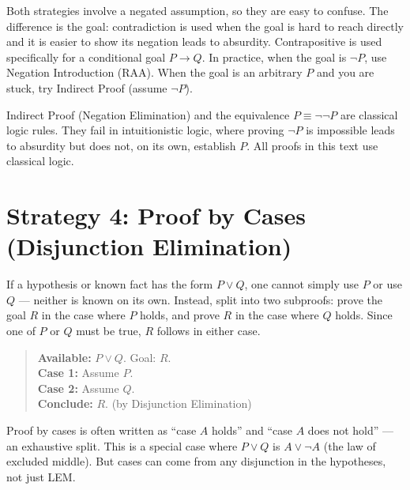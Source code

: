 \begin{remark}
Both strategies involve a negated assumption, so they are easy to confuse.
The difference is the goal: contradiction is used when the goal is hard to
reach directly and it is easier to show its negation leads to absurdity.
Contrapositive is used specifically for a conditional goal $P \to Q$.
In practice, when the goal is $\neg P$, use Negation Introduction (RAA). When
the goal is an arbitrary $P$ and you are stuck, try Indirect Proof (assume
$\neg P$).
\end{remark}

\begin{remark}
Indirect Proof (Negation Elimination) and the equivalence $P \equiv \neg\neg P$
are classical logic rules. They fail in intuitionistic logic, where proving $\neg P$
is impossible leads to absurdity but does not, on its own, establish $P$.
All proofs in this text use classical logic.
\end{remark}


\section*{Strategy 4: Proof by Cases (Disjunction Elimination)}

If a hypothesis or known fact has the form $P \vee Q$, one cannot simply use
$P$ or use $Q$ --- neither is known on its own. Instead, split into two
subproofs: prove the goal $R$ in the case where $P$ holds, and prove $R$ in
the case where $Q$ holds. Since one of $P$ or $Q$ must be true, $R$ follows
in either case.

\begin{quote}
\textbf{Available:} $P \vee Q$. Goal: $R$. \\
\textbf{Case 1:} Assume $P$. \quad [derive $R$] \\
\textbf{Case 2:} Assume $Q$. \quad [derive $R$] \\
\textbf{Conclude:} $R$. \quad (by Disjunction Elimination)
\end{quote}

\begin{remark}
Proof by cases is often written as ``case $A$ holds'' and ``case $A$ does not
hold'' — an exhaustive split. This is a special case where $P \vee Q$ is
$A \vee \neg A$ (the law of excluded middle). But cases can come from any
disjunction in the hypotheses, not just LEM.
\end{remark}

